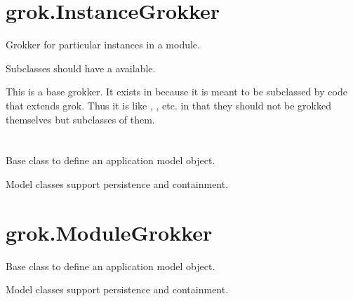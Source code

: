 \section{}

\section{}

\section{grok.InstanceGrokker}

    Grokker for particular instances in a module.

    Subclasses should have a  available.

    This is a base grokker. It exists in 
    because it is meant to be subclassed by code that extends grok.
    Thus it is like , , etc. in
    that they should not be grokked themselves but subclasses of them.


\section{}

\section{}

\section{}

    Base class to define an application model object.

    Model classes support persistence and containment.

\section{grok.ModuleGrokker}

    Base class to define an application model object.

    Model classes support persistence and containment.

\section{}

